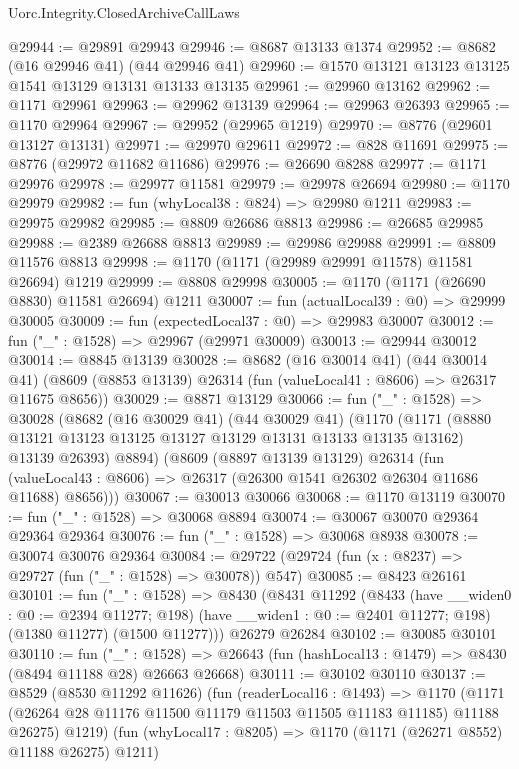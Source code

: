 \begin{lexlean}{Uorc.Integrity.ClosedArchiveCallLaws}
\begin{coremodule}
@29944 := @29891 @29943
@29946 := @8687 @13133 @1374
@29952 := @8682 (@16 @29946 @41) (@44 @29946 @41)
@29960 := @1570 @13121 @13123 @13125 @1541 @13129 @13131 @13133 @13135
@29961 := @29960 @13162
@29962 := @1171 @29961
@29963 := @29962 @13139
@29964 := @29963 @26393
@29965 := @1170 @29964
@29967 := @29952 (@29965 @1219)
@29970 := @8776 (@29601 @13127 @13131)
@29971 := @29970 @29611
@29972 := @828 @11691
@29975 := @8776 (@29972 @11682 @11686)
@29976 := @26690 @8288
@29977 := @1171 @29976
@29978 := @29977 @11581
@29979 := @29978 @26694
@29980 := @1170 @29979
@29982 := fun (whyLocal38 : @824) => @29980 @1211
@29983 := @29975 @29982
@29985 := @8809 @26686 @8813
@29986 := @26685 @29985
@29988 := @2389 @26688 @8813
@29989 := @29986 @29988
@29991 := @8809 @11576 @8813
@29998 := @1170 (@1171 (@29989 @29991 @11578) @11581 @26694) @1219
@29999 := @8808 @29998
@30005 := @1170 (@1171 (@26690 @8830) @11581 @26694) @1211
@30007 := fun (actualLocal39 : @0) => @29999 @30005
@30009 := fun (expectedLocal37 : @0) => @29983 @30007
@30012 := fun ("_" : @1528) => @29967 (@29971 @30009)
@30013 := @29944 @30012
@30014 := @8845 @13139
@30028 := @8682
    (@16 @30014 @41)
    (@44 @30014 @41)
    (@8609 (@8853 @13139) @26314 (fun (valueLocal41 : @8606) => @26317 @11675 @8656))
@30029 := @8871 @13129
@30066 := fun ("_" : @1528) =>
  @30028
    (@8682
      (@16 @30029 @41)
      (@44 @30029 @41)
      (@1170
        (@1171 (@8880 @13121 @13123 @13125 @13127 @13129 @13131 @13133 @13135 @13162) @13139 @26393)
        @8894)
      (@8609
        (@8897 @13139 @13129)
        @26314
        (fun (valueLocal43 : @8606) => @26317 (@26300 @1541 @26302 @26304 @11686 @11688) @8656)))
@30067 := @30013 @30066
@30068 := @1170 @13119
@30070 := fun ("_" : @1528) => @30068 @8894
@30074 := @30067 @30070 @29364 @29364 @29364
@30076 := fun ("_" : @1528) => @30068 @8938
@30078 := @30074 @30076 @29364
@30084 := @29722 (@29724 (fun (x : @8237) => @29727 (fun ("_" : @1528) => @30078)) @547)
@30085 := @8423 @26161
@30101 := fun ("_" : @1528) =>
  @8430
    (@8431
      @11292
      (@8433
        (have __widen0 : @0 := @2394 @11277; @198)
        (have __widen1 : @0 := @2401 @11277; @198)
        (@1380 @11277)
        (@1500 @11277)))
    @26279
    @26284
@30102 := @30085 @30101
@30110 := fun ("_" : @1528) =>
  @26643 (fun (hashLocal13 : @1479) => @8430 (@8494 @11188 @28) @26663 @26668)
@30111 := @30102 @30110
@30137 := @8529
    (@8530 @11292 @11626)
    (fun (readerLocal16 : @1493) =>
    @1170 (@1171 (@26264 @28 @11176 @11500 @11179 @11503 @11505 @11183 @11185) @11188 @26275) @1219)
    (fun (whyLocal17 : @8205) => @1170 (@1171 (@26271 @8552) @11188 @26275) @1211)

\end{coremodule}
\end{lexlean}
